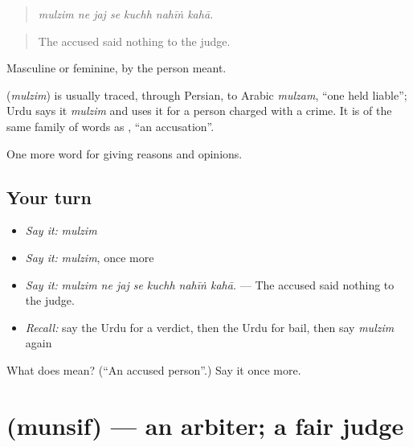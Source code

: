 \begin{quote}
      
\end{quote}

\begin{quote}
\emph{mulzim ne jaj se kuchh nahīṅ kahā.}
\end{quote}

\begin{quote}
The accused said nothing to the judge.
\end{quote}

Masculine or feminine, by the person meant.

\begin{cousinweb}
\textbf{} (\emph{mulzim}) is usually traced, through Persian, to Arabic \emph{mulzam}, \textquotedblleft{}one held liable\textquotedblright{}; Urdu says it \emph{mulzim} and uses it for a person charged with a crime. It is of the same family of words as \textbf{}, \textquotedblleft{}an accusation\textquotedblright{}.
\end{cousinweb}

\begin{grammarlens}[title={What you've built}]
One more word for giving reasons and opinions.
\end{grammarlens}

\subsection*{Your turn}
\begin{itemize}
\raggedright
  \item \emph{Say it:} \emph{mulzim}
  \item \emph{Say it:} \emph{mulzim}, once more
  \item \emph{Say it:} \emph{mulzim ne jaj se kuchh nahīṅ kahā.} — The accused said nothing to the judge.
  \item \emph{Recall:} say the Urdu for a verdict, then the Urdu for bail, then say \emph{mulzim} again
\end{itemize}

\begin{tcolorbox}[breakable,colback=teal!4,colframe=teal!35!black,title={Before you move on}]
What does  mean? (\textquotedblleft{}An accused person\textquotedblright{}.) Say it once more.
\end{tcolorbox}
\section[\texorpdfstring{\ur{منصف} (munsif)}{منصف (munsif)}]{ (munsif) — an arbiter; a fair judge}

